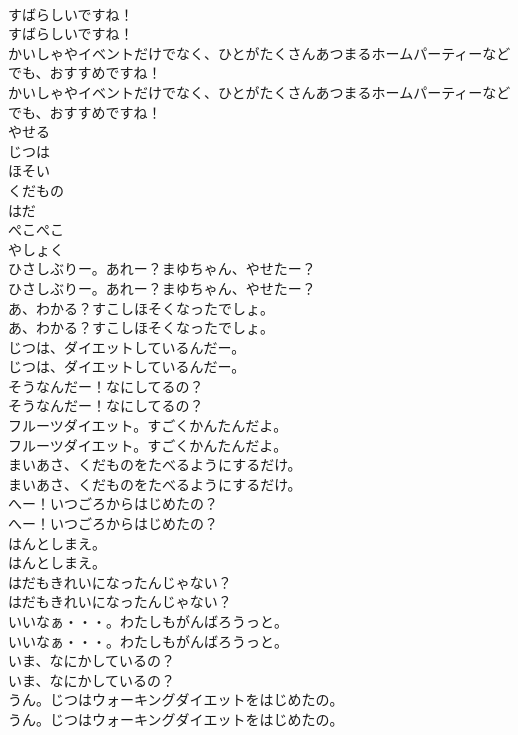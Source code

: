 \documentclass[8pt]{extreport}
\begin{document}
\begin{CJK}{UTF8}{min}
\\	すばらしいですね！	
\\	すばらしいですね！ 
\\	かいしゃやイベントだけでなく、ひとがたくさんあつまるホームパーティーなどでも、おすすめですね！	
\\	かいしゃやイベントだけでなく、ひとがたくさんあつまるホームパーティーなどでも、おすすめですね！ 
\\	やせる
\\	じつは
\\	ほそい
\\	くだもの
\\	はだ
\\	ぺこぺこ
\\	やしょく
\\	ひさしぶりー。あれー？まゆちゃん、やせたー？	
\\	ひさしぶりー。あれー？まゆちゃん、やせたー？ 
\\	あ、わかる？すこしほそくなったでしょ。	
\\	あ、わかる？すこしほそくなったでしょ。 
\\	じつは、ダイエットしているんだー。	
\\	じつは、ダイエットしているんだー。 
\\	そうなんだー！なにしてるの？	
\\	そうなんだー！なにしてるの？ 
\\	フルーツダイエット。すごくかんたんだよ。	
\\	フルーツダイエット。すごくかんたんだよ。 
\\	まいあさ、くだものをたべるようにするだけ。	
\\	まいあさ、くだものをたべるようにするだけ。 
\\	へー！いつごろからはじめたの？	
\\	へー！いつごろからはじめたの？ 
\\	はんとしまえ。	
\\	はんとしまえ。 
\\	はだもきれいになったんじゃない？	
\\	はだもきれいになったんじゃない？ 
\\	いいなぁ・・・。わたしもがんばろうっと。	
\\	いいなぁ・・・。わたしもがんばろうっと。 
\\	いま、なにかしているの？	
\\	いま、なにかしているの？ 
\\	うん。じつはウォーキングダイエットをはじめたの。	
\\	うん。じつはウォーキングダイエットをはじめたの。 

\end{CJK}
\end{document}
